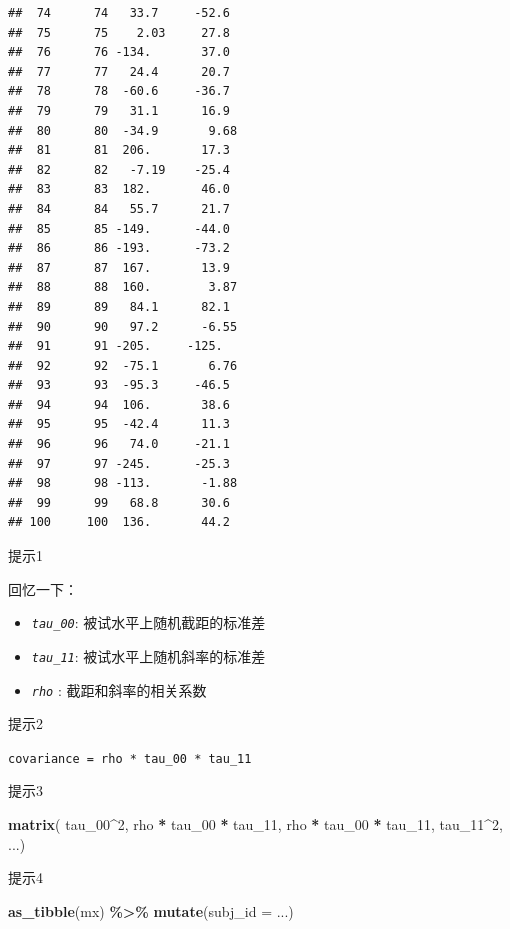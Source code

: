 \documentclass[
]{book}
\newenvironment{Shaded}{\begin{snugshade}}{\end{snugshade}}
\newcommand{\AttributeTok}[1]{\textcolor[rgb]{0.13,0.29,0.53}{#1}}
\newcommand{\DecValTok}[1]{\textcolor[rgb]{0.00,0.00,0.81}{#1}}
\newcommand{\FunctionTok}[1]{\textcolor[rgb]{0.13,0.29,0.53}{\textbf{#1}}}
\newcommand{\NormalTok}[1]{#1}
\newcommand{\SpecialCharTok}[1]{\textcolor[rgb]{0.81,0.36,0.00}{\textbf{#1}}}
\providecommand{\tightlist}{%
  \setlength{\itemsep}{0pt}\setlength{\parskip}{0pt}}
\begin{document}
\begin{verbatim}
##  74      74   33.7     -52.6  
##  75      75    2.03     27.8  
##  76      76 -134.       37.0  
##  77      77   24.4      20.7  
##  78      78  -60.6     -36.7  
##  79      79   31.1      16.9  
##  80      80  -34.9       9.68 
##  81      81  206.       17.3  
##  82      82   -7.19    -25.4  
##  83      83  182.       46.0  
##  84      84   55.7      21.7  
##  85      85 -149.      -44.0  
##  86      86 -193.      -73.2  
##  87      87  167.       13.9  
##  88      88  160.        3.87 
##  89      89   84.1      82.1  
##  90      90   97.2      -6.55 
##  91      91 -205.     -125.   
##  92      92  -75.1       6.76 
##  93      93  -95.3     -46.5  
##  94      94  106.       38.6  
##  95      95  -42.4      11.3  
##  96      96   74.0     -21.1  
##  97      97 -245.      -25.3  
##  98      98 -113.       -1.88 
##  99      99   68.8      30.6  
## 100     100  136.       44.2
\end{verbatim}

提示1

回忆一下：

\begin{itemize}
\tightlist
\item
  \emph{\texttt{tau\_00}}: 被试水平上随机截距的标准差
\item
  \emph{\texttt{tau\_11}}: 被试水平上随机斜率的标准差
\item
  \emph{\texttt{rho}} : 截距和斜率的相关系数
\end{itemize}

提示2

\texttt{covariance\ =\ rho\ *\ tau\_00\ *\ tau\_11}

提示3

\begin{Shaded}
\begin{Highlighting}[]
\FunctionTok{matrix}\NormalTok{(    tau\_00}\SpecialCharTok{\^{}}\DecValTok{2}\NormalTok{,            rho }\SpecialCharTok{*}\NormalTok{ tau\_00 }\SpecialCharTok{*}\NormalTok{ tau\_11,}
\NormalTok{        rho }\SpecialCharTok{*}\NormalTok{ tau\_00 }\SpecialCharTok{*}\NormalTok{ tau\_11,      tau\_11}\SpecialCharTok{\^{}}\DecValTok{2}\NormalTok{, ...)}
\end{Highlighting}
\end{Shaded}

提示4

\begin{Shaded}
\begin{Highlighting}[]
\FunctionTok{as\_tibble}\NormalTok{(mx) }\SpecialCharTok{\%\textgreater{}\%}
  \FunctionTok{mutate}\NormalTok{(}\AttributeTok{subj\_id =}\NormalTok{ ...)}
\end{Highlighting}
\end{Shaded}
\end{document}
